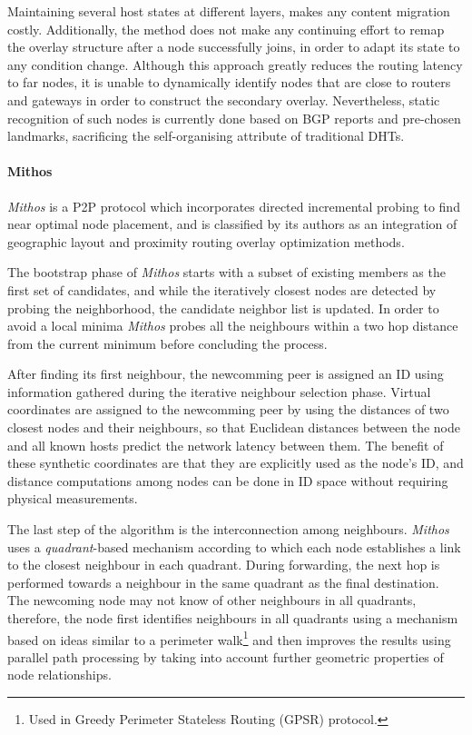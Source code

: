 Maintaining several host states at different layers, makes any content migration
costly. Additionally, the method does not make any continuing effort to remap
the overlay structure after a node successfully joins, in order to adapt its
state to any condition change. Although this approach greatly reduces the
routing latency to far nodes, it is unable to dynamically identify nodes that
are close to routers and gateways in order to construct the secondary overlay.
Nevertheless, static recognition of such nodes is currently done based on BGP
reports and pre-chosen landmarks, sacrificing the self-organising attribute of
traditional DHTs.

\paragraph*{\bf Mithos}
\textit{Mithos} \cite{waldvogel_mythos_2003} is a P2P protocol which
incorporates directed incremental probing to find near optimal node placement,
and is classified by its authors as an integration of geographic layout and
proximity routing overlay optimization methods.

The bootstrap phase of \textit{Mithos} starts with a subset of existing members
as the first set of candidates, and while the iteratively closest nodes are
detected by probing the neighborhood, the candidate neighbor list is updated. In
order to avoid a local minima \textit{Mithos} probes all the neighbours within a
two hop distance from the current minimum before concluding the process.

After finding its first neighbour, the newcomming peer is assigned an ID using
information gathered during the iterative neighbour selection phase. Virtual
coordinates are assigned to the newcomming peer by using the distances of two
closest nodes and their neighbours, so that Euclidean distances between the node
and all known hosts predict the network latency between
them\cite{cox_vivaldi_2004}.  The benefit of these synthetic coordinates are
that they are explicitly used as the node's ID, and distance computations among
nodes can be done in ID space without requiring physical measurements.

The last step of the algorithm is the interconnection among neighbours.
\emph{Mithos} uses a \emph{quadrant}-based mechanism according to which each
node establishes a link to the closest neighbour in each quadrant. During
forwarding, the next hop is performed towards a neighbour in the same quadrant
as the final destination. The newcoming node may not know of other neighbours
in all quadrants, therefore, the node first identifies neighbours in all
quadrants using a mechanism based on ideas similar to a perimeter
walk\footnote{Used in Greedy Perimeter Stateless Routing (GPSR) protocol.} and
then improves the results using parallel path processing by taking into account
further geometric properties of node relationships.

